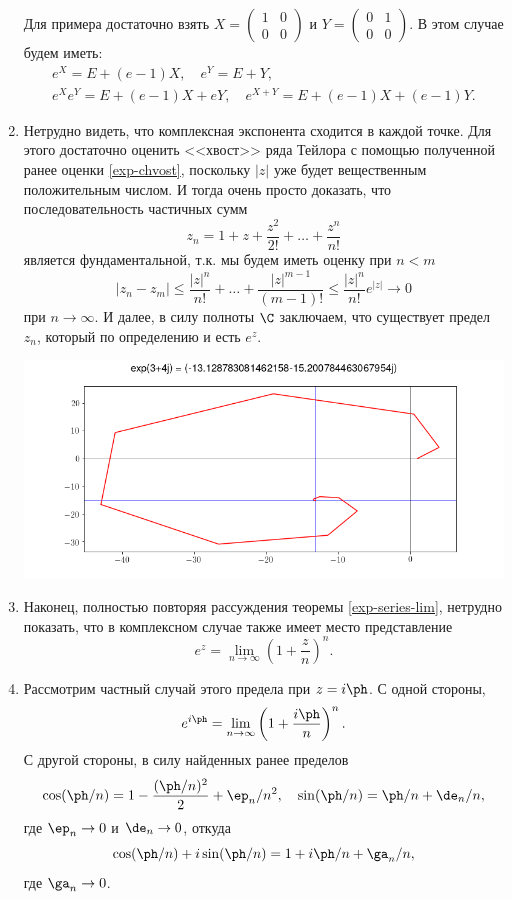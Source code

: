 \begin{enumerate}
Для примера достаточно взять $X=\begin{pmatrix}1 & 0\\ 0 & 0\end{pmatrix}$ и $Y=\begin{pmatrix}0 & 1\\ 0 & 0\end{pmatrix}$.
В этом случае будем иметь:
\begin{gather*}
e^X = E+(e-1)X,\quad e^Y = E+Y,\\
e^Xe^Y = E+(e-1)X+eY,\quad e^{X+Y}=E+(e-1)X+(e-1)Y.
\end{gather*}

\item Нетрудно видеть, что комплексная экспонента сходится в каждой точке. Для этого достаточно оценить <<хвост>> ряда Тейлора с помощью полученной ранее оценки \eqref{exp-chvost}, поскольку $|z|$ уже будет вещественным положительным числом. И тогда очень просто доказать, что последовательность частичных сумм
$$
z_n=1+z+\frac{z^2}{2!}+\dots+\frac{z^n}{n!}
$$
является фундаментальной, т.к. мы будем иметь оценку при $n<m$
$$
|z_n-z_m|\le \frac{|z|^n}{n!}+\dots+\frac{|z|^{m-1}}{(m-1)!}\le \frac{|z|^n}{n!}e^{|z|}\to 0
$$
при $n\to\infty$. И далее, в силу полноты $\C$ заключаем, что существует предел $z_n$, который по определению и есть $e^z$.
\begin{center}
\includegraphics[scale=0.5]{exp-series.png}
\end{center}

\item Наконец, полностью повторяя рассуждения теоремы \ref{exp-series-lim}, нетрудно показать, что в комплексном случае также имеет место представление
$$
e^z = \lim_{n\to\infty}\left(1+\frac zn\right)^n.
$$
\item Рассмотрим частный случай этого предела при $z=i\ph$. С одной стороны,
$$
e^{i\ph} = \lim_{n\to\infty}\left(1+\frac{i\ph}{n}\right)^n.
$$
С другой стороны, в силу найденных ранее пределов
$$
\cos(\ph/n) = 1-\frac{(\ph/n)^2}{2}+\ep_n/n^2,\quad\sin(\ph/n)=\ph/n+\de_n/n,
$$
где $\ep_n\to 0$ и $\de_n\to 0$, откуда
$$
\cos(\ph/n)+i\sin(\ph/n) = 1 + i\ph/n + \ga_n/n,
$$
где $\ga_n\to 0$.


\end{enumerate}
